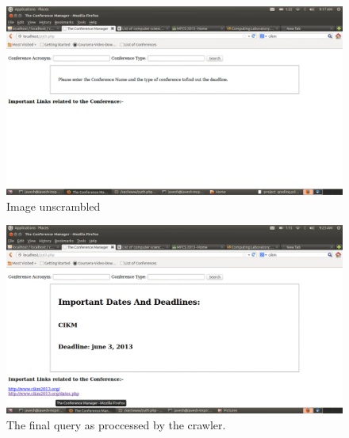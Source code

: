 \documentclass[]{article}
\begin{document}
\begin{figure}
	\centering
	\includegraphics[width=0.95\columnwidth]{initial.png}
	\caption{Image unscrambled}
	\label{fig:block5}
\end{figure}
\begin{figure}
	\centering
	\includegraphics[width=0.95\columnwidth]{result.png}
	\caption{The final query as proccessed by the crawler.}
	\label{fig:block2}
\end{figure}
\end{document}
